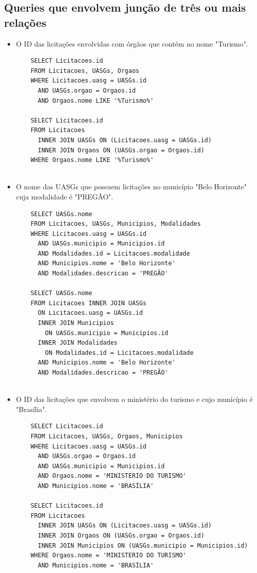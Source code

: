 \documentclass{article}
\begin{document}
\subsection{Queries que envolvem junção de três ou mais relações}
\begin{itemize}
\item O ID das licitações envolvidas com órgãos que contém no nome "Turismo".
  \begin{verbatim}
    SELECT Licitacoes.id
    FROM Licitacoes, UASGs, Orgaos
    WHERE Licitacoes.uasg = UASGs.id
      AND UASGs.orgao = Orgaos.id
      AND Orgaos.nome LIKE '%Turismo%'

    SELECT Licitacoes.id
    FROM Licitacoes
      INNER JOIN UASGs ON (Licitacoes.uasg = UASGs.id)
      INNER JOIN Orgaos ON (UASGs.orgao = Orgaos.id) 
    WHERE Orgaos.nome LIKE '%Turismo%'
  
\end{verbatim}  
\item O nome das UASGs que possuem licitações no município "Belo Horizonte" cuja modalidade é "PREGÃO".
  \begin{verbatim}
    SELECT UASGs.nome
    FROM Licitacoes, UASGs, Municipios, Modalidades
    WHERE Licitacoes.uasg = UASGs.id
      AND UASGs.municipio = Municipios.id    
      AND Modalidades.id = Licitacoes.modalidade 
      AND Municipios.nome = 'Belo Horizonte'
      AND Modalidades.descricao = 'PREGÃO'

    SELECT UASGs.nome
    FROM Licitacoes INNER JOIN UASGs
      ON Licitacoes.uasg = UASGs.id
      INNER JOIN Municipios
        ON UASGs.municipio = Municipios.id
      INNER JOIN Modalidades
        ON Modalidades.id = Licitacoes.modalidade
      AND Municipios.nome = 'Belo Horizonte'
      AND Modalidades.descricao = 'PREGÃO'
      
  \end{verbatim}
\pagebreak
\item O ID das licitações que envolvem o ministério do turismo e cujo município é "Brasília".
  \begin{verbatim}
    SELECT Licitacoes.id
    FROM Licitacoes, UASGs, Orgaos, Municipios
    WHERE Licitacoes.uasg = UASGs.id
      AND UASGs.orgao = Orgaos.id
      AND UASGs.municipio = Municipios.id 
      AND Orgaos.nome = 'MINISTERIO DO TURISMO'
      AND Municipios.nome = 'BRASÍLIA'

    SELECT Licitacoes.id
    FROM Licitacoes
      INNER JOIN UASGs ON (Licitacoes.uasg = UASGs.id)
      INNER JOIN Orgaos ON (UASGs.orgao = Orgaos.id)
      INNER JOIN Municipios ON (UASGs.municipio = Municipios.id)
    WHERE Orgaos.nome = 'MINISTERIO DO TURISMO'
      AND Municipios.nome = 'BRASÍLIA'
  \end{verbatim}
    
\end{itemize}
\end{document}
